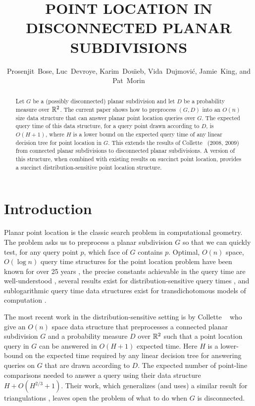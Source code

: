 \documentclass{patmorin}
\title{\MakeUppercase{Point Location in Disconnected Planar Subdivisions}}
\author{Prosenjit~Bose, 
        Luc~Devroye,
	Karim~Dou\"{\i}eb, 
	Vida~Dujmovi\'c, 
	Jamie~King, and 
	Pat~Morin}
\begin{document}
\maketitle

\begin{abstract}
Let $G$ be a (possibly disconnected) planar subdivision and let $D$
be a probability measure over $\mathbb{R}^2$.  The current paper shows how to
preprocess $(G,D)$ into an $O(n)$ size data structure that can answer
planar point location queries over $G$.  The expected query time of this
data structure, for a query point drawn according to $D$, is $O(H+1)$,
where $H$ is a lower bound on the expected query time of any linear
decision tree for point location in $G$.  This extends the results
of Collette \etal\ (2008, 2009) from connected planar subdivisions to
disconnected planar subdivisions.  A version of this structure, when
combined with existing results on succinct point location, provides a
succinct distribution-sensitive point location structure.
\end{abstract}

\section{Introduction}

Planar point location is the classic search problem in computational
geometry.  The problem asks us to preprocess a planar subdivision
$G$ so that we can quickly test, for any query point $p$, which
face of $G$ contains $p$.  Optimal, $O(n)$ space, $O(\log n)$ query
time structures for the point location problem have been known for
over 25 years \cite{egs86,k83,m90,st86}, the precise constants
achievable in the query time are well-understood \cite{as98},
several results exist for distribution-sensitive query times
\cite{acmr00,amm00,amm01a,amm01b,ammw07,cdilm08,cdilm09,i01,i04}, and
sublogarithmic query time data structures exist for transdichotomous
models of computation \cite{c06,cp09,p06}.

The most recent work in the distribution-sensitive setting is by
Collette \etal\ \cite{cdilm08} who give an $O(n)$ space data structure
that preprocesses a connected planar subdivision $G$ and a probability
measure $D$ over $\mathbb{R}^2$ such that a point location query in $G$ can
be answered in $O(H+1)$ expected time.  Here $H$ is a lower-bound on
the expected time required by any linear decision tree for answering
queries on $G$ that are drawn according to $D$.  The expected number of
point-line comparisons needed to answer a query using their data structure
$H + O(H^{2/3}+1)$.  Their work, which generalizes (and uses) a similar
result for triangulations \cite{ammw07}, leaves open the problem of what
to do when $G$ is disconnected.
\end{document}
